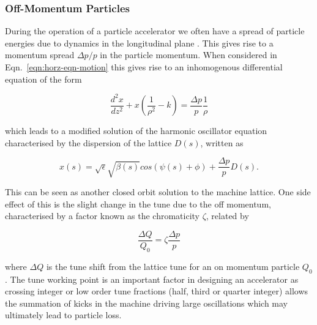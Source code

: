 \subsubsection{Off-Momentum Particles}

During the operation of a particle accelerator we often have a spread of particle energies due to dynamics in the longitudinal plane \cite{Leduff:LongDyn}. This gives rise to a momentum spread $\Delta p/p$ in the particle momentum. When considered in Eqn.~\ref{eqn:horz-eqn-motion} this gives rise to an inhomogenous differential equation of the form

\begin{equation}
\frac{d^{2}x}{dz^{2}} + x \left( \frac{1}{\rho^{2}} - k\right)  = \frac{\Delta p}{p}\frac{1}{\rho}
\label{eqn:disp-eqn-motion}
\end{equation}

which leads to a modified solution of the harmonic oscillator equation characterised by the dispersion of the lattice $D(s)$, written as

\begin{equation}
x \left( s \right) = \sqrt{\epsilon} \sqrt{\beta \left( s \right) } cos \left( \psi \left( s \right) + \phi \right) + \frac{\Delta p}{p} D \left( s \right).
\end{equation}

This can be seen as another closed orbit solution to the machine lattice. One side effect of this is the slight change in the tune due to the off momentum, characterised by a factor known as the chromaticity $\zeta$, related by

\begin{equation}
\frac{\Delta Q}{Q_{0}} = \zeta \frac{\Delta p}{p}
\end{equation}

where $\Delta Q$ is the tune shift from the lattice tune for an on momentum particle $Q_{0}$. The tune working point is an important factor in designing an accelerator as crossing integer or low order tune fractions (half, third or quarter integer) allows the summation of kicks in the machine driving large oscillations which may ultimately lead to particle loss. 
